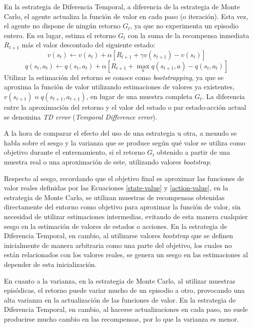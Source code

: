 En la estrategia de Diferencia Temporal, a diferencia de la estrategia de Monte Carlo, el agente actualiza la función de valor en cada paso (o iteración). Esta vez, el agente no dispone de ningún retorno $G_t$, ya que no experimenta un episodio entero. En su lugar, estima el retorno $G_t$ con la suma de la recompensa inmediata $R_{t+1}$ más el valor descontado del siguiente estado: 
\begin{equation}
    v(s_t) \leftarrow v(s_t) + \alpha [R_{t+1} + \gamma v(s_{t+1}) - v(s_t)]
    \label{eq:mc-state}
\end{equation}
\begin{equation}
    q(s_t, a_t) \leftarrow q(s_t, a_t) + \alpha [R_{t+1} + \max_{a} q(s_{t+1}, a) - q(s_t, a_t)]
    \label{eq:mc-action}
\end{equation}
Utilizar la estimación del retorno se conoce como \emph{bootstrapping}, ya que se aproxima la función de valor utilizando estimaciones de valores ya existentes, $v(s_{t+1})$ o $q(s_{t+1}, a_{t+1})$, en lugar de una muestra completa $G_t$. La diferencia entre la aproximación del retorno y el valor del estado o par estado-acción actual se denomina \emph{TD error} (\emph{Temporal Difference error}).

A la hora de comparar el efecto del uso de una estrategia u otra, a menudo se habla sobre el sesgo y la varianza que se produce según qué valor se utiliza como objetivo durante el entrenamiento, si el retorno $G_t$ obtenido a partir de una muestra real o una aproximación de este, utilizando valores \emph{bootstrap}.

Respecto al sesgo, recordando que el objetivo final es aproximar las funciones de valor reales definidas por las Ecuaciones \ref{state-value} y \ref{action-value}, en la estrategia de Monte Carlo, se utilizan muestras de recompensas obtenidas directamente del entorno como objetivo para aproximar la función de valor, sin necesidad de utilizar estimaciones intermedias, evitando de esta manera cualquier sesgo en la estimación de valores de estados o acciones. En la estrategia de Diferencia Temporal, en cambio, al utilizarse valores \emph{bootstrap} que se definen inicialmente de manera arbitraria como una parte del objetivo, los cuales no están relacionados con los valores reales, se genera un sesgo en las estimaciones al depender de esta inicialización.

En cuanto a la varianza, en la estrategia de Monte Carlo, al utilizar muestras episódicas, el retorno puede variar mucho de un episodio a otro, provocando una alta varianza en la actualización de las funciones de valor. En la estrategia de Diferencia Temporal, en cambio, al hacerse actualizaciones en cada paso, no suele producirse mucho cambio en las recompensas, por lo que la varianza es menor.

